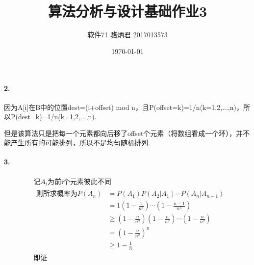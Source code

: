 \documentclass[UTF8]{ctexart}
\title{算法分析与设计基础作业3}
\author{软件71 骆炳君 2017013573}
\date{\today}
\begin{document}
\maketitle
{}

\paragraph{2.}
因为A[i]在B中的位置dest=(i+offset) mod n，且P(offset=k)=1/n(k=1,2,...,n)，所以P(dest=k)=1/n(k=1,2,...,n).

但是该算法只是把每一个元素都向后移了offset个元素（将数组看成一个环），并不能产生所有的可能排列，所以不是均匀随机排列.

\paragraph{3.}
\begin{align*}
    &\text{记$A_i$为前i个元素彼此不同}\\
    &
    \begin{aligned}
        \text{则所求概率为}P(A_n)&=P(A_1)P(A_2|A_1)\cdots P(A_n|A_{n-1})\\
        &=1(1-\frac{1}{n^3})\cdots(1-\frac{n-1}{n^3})\\
        &\ge(1-\frac{n}{n^2})(1-\frac{n}{n^2})\cdots(1-\frac{n}{n^2})\\
        &=(1-\frac{n}{n^2})^n\\
        &\ge1-\frac{1}{n}
    \end{aligned}\\
    &\text{即证}
\end{align*}
\end{document}
